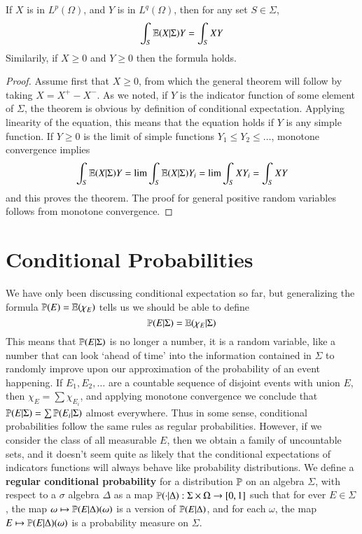 \begin{lemma}
    If $X$ is in $L^p(\Omega)$, and $Y$ is in $L^q(\Omega)$, then for any set $S \in \Sigma$,
    \[ \int_S \operatorname{\mathbb{E}}(X|\Sigma) Y = \int_S XY \]
    Similarily, if $X \geq 0$ and $Y \geq 0$ then the formula holds.
\end{lemma}
\begin{proof}
    Assume first that $X \geq 0$, from which the general theorem will follow by taking $X = X^+ - X^-$. As we noted, if $Y$ is the indicator function of some element of $\Sigma$, the theorem is obvious by definition of conditional expectation. Applying linearity of the equation, this means that the equation holds if $Y$ is any simple function. If $Y \geq 0$ is the limit of simple functions $Y_1 \leq Y_2 \leq \dots$, monotone convergence implies
    \[ \int_S \operatorname{\mathbb{E}}(X|\Sigma) Y = \lim \int_S \operatorname{\mathbb{E}}(X|\Sigma) Y_i = \lim \int_S XY_i = \int_S XY \]
    and this proves the theorem. The proof for general positive random variables follows from monotone convergence.
\end{proof}

\section{Conditional Probabilities}

We have only been discussing conditional expectation so far, but generalizing the formula $\operatorname{\mathbb{P}}(E) = \operatorname{\mathbb{E}}(\chi_E)$ tells us we should be able to define
%
\[ \operatorname{\mathbb{P}}(E|\Sigma) = \operatorname{\mathbb{E}}(\chi_E | \Sigma) \]
%
This means that $\operatorname{\mathbb{P}}(E|\Sigma)$ is no longer a number, it is a random variable, like a number that can look `ahead of time' into the information contained in $\Sigma$ to randomly improve upon our approximation of the probability of an event happening. If $E_1, E_2, \dots$ are a countable sequence of disjoint events with union $E$, then $\chi_E = \sum \chi_{E_i}$, and applying monotone convergence we conclude that $\operatorname{\mathbb{P}}(E|\Sigma) = \sum \operatorname{\mathbb{P}}(E_i|\Sigma)$ almost everywhere. Thus in some sense, conditional probabilities follow the same rules as regular probabilities. However, if we consider the class of all measurable $E$, then we obtain a family of uncountable sets, and it doesn't seem quite as likely that the conditional expectations of indicators functions will always behave like probability distributions. We define a {\bf regular conditional probability} for a distribution $\operatorname{\mathbb{P}}$ on an algebra $\Sigma$, with respect to a $\sigma$ algebra $\Delta$ as a map $\operatorname{\mathbb{P}}(\cdot |\Delta): \Sigma \times \Omega \to [0,1]$ such that for ever $E \in \Sigma$, the map $\omega \mapsto \operatorname{\mathbb{P}}(E|\Delta)(\omega)$ is a version of $\operatorname{\mathbb{P}}(E|\Delta)$, and for each $\omega$, the map $E \mapsto \operatorname{\mathbb{P}}(E|\Delta)(\omega)$ is a probability measure on $\Sigma$.

